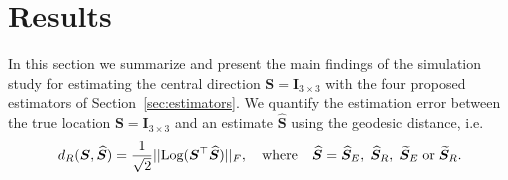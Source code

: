 \section{Results}\label{sec:results}

In this section we summarize and present the main findings of the simulation study for  estimating the central direction $\bm S = \bm I_{3\times 3}$ with the four proposed estimators of Section~\ref{sec:estimators}. We quantify the estimation error between the true location $\bm S = \bm I_{3\times 3}$ and an estimate $\widehat{\bm S}$ using the geodesic distance, i.e.  
\begin{equation}
{d_R}(\bm{S}, \widehat{\bm{S}}) =  \frac{1}{\sqrt{2}}||
\text{Log}(\bm{S}^\top\widehat{\bm{S}})||_F, \quad \mbox{where} \quad \widehat{\bm{S}} =  {\widehat{\bm S}_E}, \; {\widehat{\bm S}_R},\;  {\widetilde{\bm S}_E} \; \mbox{or} \; {\widetilde{\bm S}_R}.
\end{equation}

